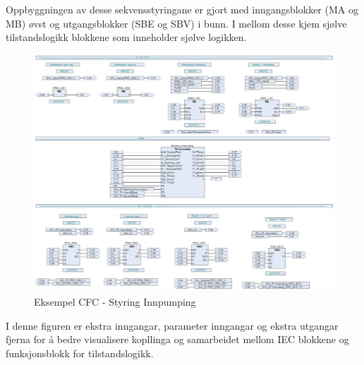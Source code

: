 Oppbyggningen av desse sekvensstyringane er gjort med inngangsblokker (MA og MB) øvst og utgangsblokker (SBE og SBV) i bunn.
I mellom desse kjem sjølve tilstandslogikk blokkene som inneholder sjølve logikken.

\begin{figure}[htbp]
    \centering
    \includegraphics[width=1\textwidth]{Bilder/Heile_innpump.png}
    \caption{Eksempel CFC - Styring Innpumping}\label{fig:CFCInnpumping}
\end{figure}

I denne figuren er ekstra inngangar, parameter inngangar og ekstra utgangar fjerna for å bedre visualisere kopllinga og samarbeidet mellom
IEC blokkene og funksjonsblokk for tilstandslogikk.

\newpage

